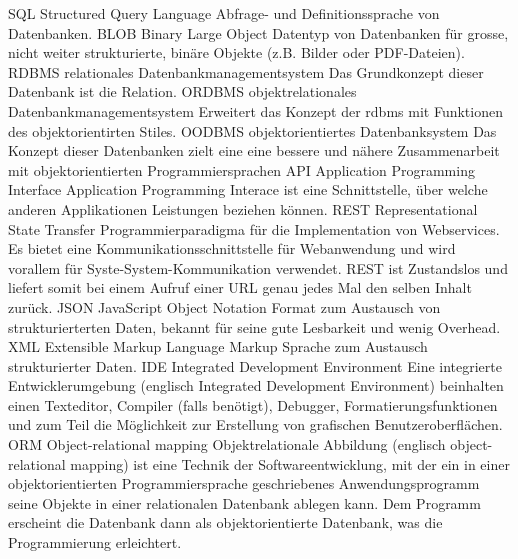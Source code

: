   {SQL}               %
  {Structured Query Language}  %
  {Abfrage- und Definitionssprache von Datenbanken.}
  {BLOB}               %
  {Binary Large Object}  %
  {Datentyp von Datenbanken für grosse, nicht weiter strukturierte, binäre Objekte (z.B. Bilder oder PDF-Dateien).}
  {RDBMS}               %
  {relationales Datenbankmanagementsystem}  %
  {Das Grundkonzept dieser Datenbank ist die Relation.}
  {ORDBMS}               %
  {objektrelationales Datenbankmanagementsystem}  %
  {Erweitert das Konzept der \gls{rdbms} mit Funktionen des objektorientirten Stiles.}
  {OODBMS}               %
  {objektorientiertes Datenbanksystem}  %
  {Das Konzept dieser Datenbanken zielt eine eine bessere und nähere Zusammenarbeit mit objektorientierten Programmiersprachen}
  {API}               %
  {Application Programming Interface}
  {Application Programming Interace ist eine Schnittstelle, über welche anderen Applikationen Leistungen beziehen können.}
  {REST}               %
  {Representational State Transfer}
  {Programmierparadigma für die Implementation von Webservices. Es bietet eine Kommunikationsschnittstelle für Webanwendung und 
wird vorallem für Syste-System-Kommunikation verwendet. REST ist Zustandslos und liefert somit bei einem Aufruf einer URL genau 
jedes Mal den selben Inhalt zurück.}
  {JSON}               %
  {JavaScript Object Notation}  %
  {Format zum Austausch von strukturierterten Daten, bekannt für seine gute Lesbarkeit und wenig Overhead.}
  {XML}               %
  {Extensible Markup Language}  %
  {Markup Sprache zum Austausch strukturierter Daten.}
  {IDE}               %
  {Integrated Development Environment}  %
  {Eine integrierte Entwicklerumgebung (englisch Integrated Development Environment) beinhalten einen Texteditor, 
Compiler (falls benötigt), Debugger, Formatierungsfunktionen und zum Teil die Möglichkeit zur Erstellung von grafischen 
Benutzeroberflächen.}
  {ORM}               %
  {Object-relational mapping}  %
  {Objektrelationale Abbildung (englisch object-relational mapping) ist eine Technik der Softwareentwicklung, mit der ein in einer 
objektorientierten Programmiersprache geschriebenes Anwendungsprogramm seine Objekte in einer relationalen Datenbank ablegen 
kann. Dem Programm erscheint die Datenbank dann als objektorientierte Datenbank, was die Programmierung erleichtert. 
\cite{wiki_orm}}
